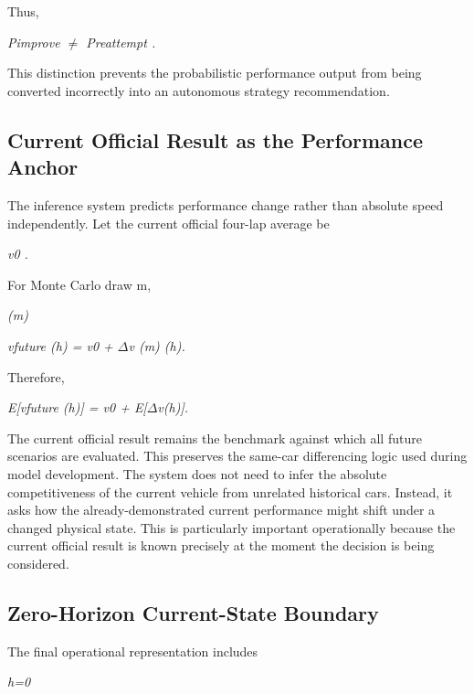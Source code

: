 Thus,

\begin{center}\textit{Pimprove \ensuremath{\neq} Preattempt .}\end{center}

This distinction prevents the probabilistic performance output from being converted incorrectly into an autonomous strategy recommendation.

\subsection{Current Official Result as the Performance Anchor}
The inference system predicts performance change rather than absolute speed independently. Let the current official four-lap average be

\begin{center}\textit{v0 .}\end{center}

For Monte Carlo draw m,

\begin{center}\textit{(m)}\end{center}

\begin{center}\textit{vfuture (h) = v0 + \ensuremath{\Delta}v (m) (h).}\end{center}

Therefore,

\begin{center}\textit{E[vfuture (h)] = v0 + E[\ensuremath{\Delta}v(h)].}\end{center}

The current official result remains the benchmark against which all future scenarios are evaluated. This preserves the same-car differencing logic used during model development. The system does not need to infer the absolute competitiveness of the current vehicle from unrelated historical cars. Instead, it asks how the already-demonstrated current performance might shift under a changed physical state. This is particularly important operationally because the current official result is known precisely at the moment the decision is being considered.

\subsection{Zero-Horizon Current-State Boundary}
The final operational representation includes

\begin{center}\textit{h=0}\end{center}


